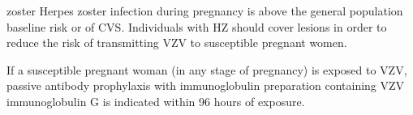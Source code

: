\begin{commentbox}{zoster}
Herpes zoster infection during pregnancy is  above the general population baseline risk or of CVS. 
Individuals with HZ should cover lesions in order to reduce the risk of transmitting VZV to susceptible pregnant women.\par
If a susceptible pregnant woman (in any stage of pregnancy) is exposed to VZV, passive antibody prophylaxis with immunoglobulin preparation containing VZV immunoglobulin G is indicated within 96 hours of exposure.
\end{commentbox}
